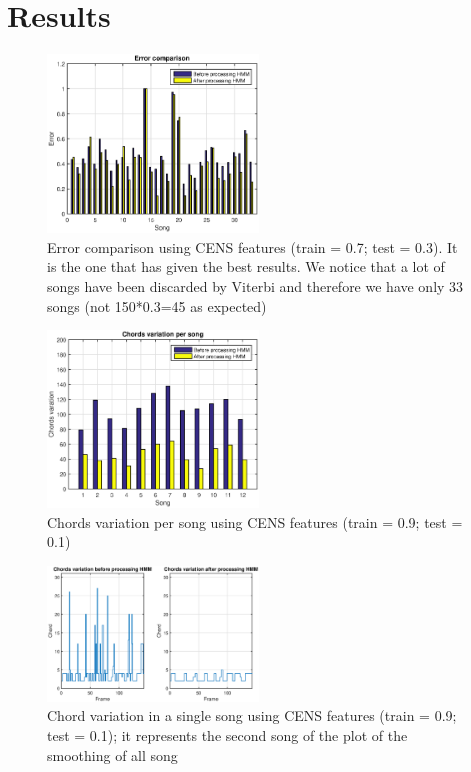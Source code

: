 \section{Results}
\label{sec:results}


\begin{figure} [h!]
	\includegraphics[width=0.5\textwidth]{img/Result_HMM/CENS/plot03071}
	\caption{Error comparison using CENS features (train = 0.7; test = 0.3). It is the one that has given the best results. We notice that a lot of songs have been discarded by Viterbi and therefore we have only 33 songs (not 150*0.3=45 as expected)}
\end{figure}

\begin{figure} [h!]
	\includegraphics[width=0.5\textwidth]{img/Result_HMM/SMOOTHING/SmoothPerSongCENS0109}
	\caption{Chords variation per song using CENS features (train = 0.9; test = 0.1)}
\end{figure}

\begin{figure} [h!]
	\includegraphics[width=0.5\textwidth]{img/Result_HMM/SMOOTHING/SmoothSingleSongCENS0109}
	\caption{Chord variation in a single song using CENS features (train = 0.9; test = 0.1); it represents the second song of the plot of the smoothing of all song}
\end{figure}
